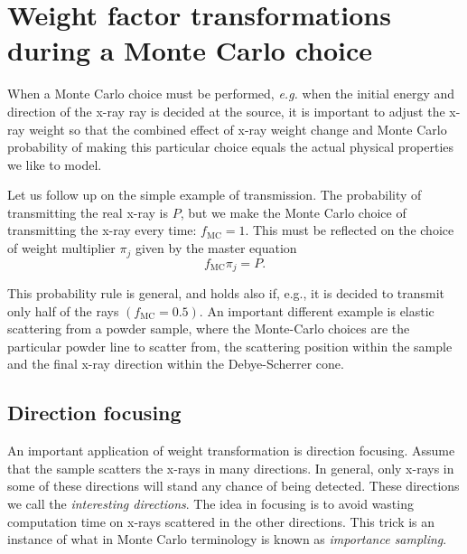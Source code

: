 \section{Weight factor transformations during a Monte Carlo
 choice}
When a Monte Carlo choice must be performed, {\em e.g.} when the
initial energy and direction of the x-ray ray is decided at the source,
it is important to adjust the x-ray weight so that the combined
effect of x-ray weight change and Monte Carlo probability
of making this particular choice
equals the actual physical properties we like to model.

Let us follow up on the simple example of transmission.
The probability of transmitting the real x-ray is $P$, but we make
the Monte Carlo choice of transmitting the x-ray every time:
$f_\mathrm{MC}=1$. This must be reflected on the choice of weight multiplier
$\pi_j$ given by the master equation
\begin{equation} \label{probrule}
f_\mathrm{MC} \pi_j = P .
\end{equation}

This probability rule is general, and holds also if, e.g., it is decided to
transmit only half of the rays $(f_\mathrm{MC}=0.5)$.
An important different example
is elastic scattering from a powder sample,
where the Monte-Carlo choices are the particular powder line to scatter from,
the scattering position within the sample and the final x-ray direction
within the Debye-Scherrer cone.

\subsection{Direction focusing}
\label{s:focus}
An important application of weight transformation is direction focusing.
Assume that the sample scatters the x-rays in many directions.
In general, only x-rays in some of these directions will
stand any chance of being detected. These directions we call
the {\em interesting directions}.
The idea in focusing is to avoid wasting computation time on
x-rays scattered in the other directions.
This trick is an instance of what in Monte Carlo terminology
is known as {\em importance sampling}. %

